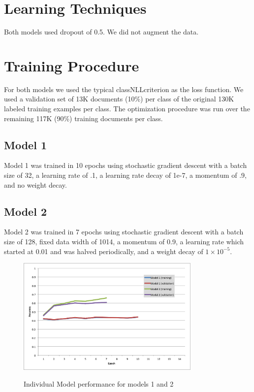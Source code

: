 \documentclass{article} %
\begin{document}
\section{Learning Techniques}

Both models used dropout of 0.5. We did not augment the data. 

\section{Training Procedure}

For both models we used the typical classNLLcriterion as the loss function. We used a validation set of 13K documents (10\%) per class of the original 130K labeled training examples per class.
The optimization procedure was run over the remaining 117K (90\%) training documents per class.


\subsection{Model 1}

Model 1 was trained in 10 epochs using stochastic gradient descent with a batch size of 32, a learning rate of .1, a learning rate decay of 1e-7, a momentum of .9, and no weight decay.

\subsection{Model 2}

Model 2 was trained in 7 epochs using stochastic gradient descent with
a batch size of 128, fixed data width of 1014, a momentum of 0.9, a
learning rate which started at 0.01 and was halved periodically, and a
weight decay of $1\times 10^{-5}$.


\begin{figure}
	\includegraphics[width=0.8\textwidth]{Training}
        \label{fig1}
        \caption{Individual Model performance for models 1 and 2}
\end{figure}
\end{document}
